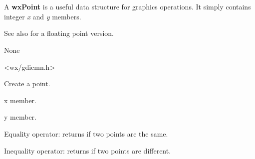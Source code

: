 \section{}\label{wxpoint}

A {\bf wxPoint} is a useful data structure for graphics operations.
It simply contains integer {\it x} and {\it y} members.

See also  for a floating point version.


None


<wx/gdicmn.h>




\label{wxpointctor}



Create a point.

\label{wxpointx}


x member.

\label{wxpointy}


y member.

\label{wxpointequal}


Equality operator: returns \true if two points are the same.


\label{wxpointnotequal}


Inequality operator: returns \true if two points are different.

